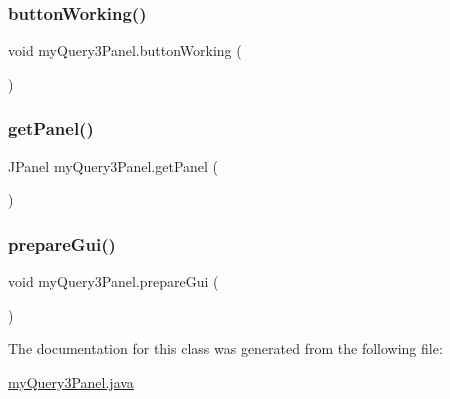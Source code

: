\subsubsection{\texorpdfstring{button\+Working()}{buttonWorking()}}
{\footnotesize\ttfamily void my\+Query3\+Panel.\+button\+Working (\begin{DoxyParamCaption}{ }\end{DoxyParamCaption})}

\hypertarget{classmy_query3_panel_a7e32c709687bc0e276dbfb4abc101c83}{}\label{classmy_query3_panel_a7e32c709687bc0e276dbfb4abc101c83} 
\subsubsection{\texorpdfstring{get\+Panel()}{getPanel()}}
{\footnotesize\ttfamily J\+Panel my\+Query3\+Panel.\+get\+Panel (\begin{DoxyParamCaption}{ }\end{DoxyParamCaption})}

\hypertarget{classmy_query3_panel_a0ba85999b328528fb1255d54f9e35adf}{}\label{classmy_query3_panel_a0ba85999b328528fb1255d54f9e35adf} 
\subsubsection{\texorpdfstring{prepare\+Gui()}{prepareGui()}}
{\footnotesize\ttfamily void my\+Query3\+Panel.\+prepare\+Gui (\begin{DoxyParamCaption}{ }\end{DoxyParamCaption})}



The documentation for this class was generated from the following file\+:\begin{DoxyCompactItemize}
\item 
\hyperlink{my_query3_panel_8java}{my\+Query3\+Panel.\+java}\end{DoxyCompactItemize}
